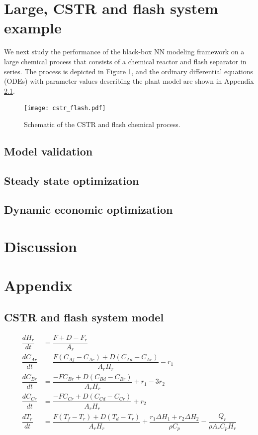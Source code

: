 \documentclass[10pt]{article}
\begin{document}
\section{Large, CSTR and flash system example}
We next study the performance of the black-box NN modeling framework on a large chemical process that consists of a chemical reactor and flash separator in series. The process is depicted in Figure \ref{fig:cstr_flash}, and the ordinary differential equations (ODEs) with parameter values describing the plant model are shown in Appendix \ref{app:cstr_flash}.

\begin{figure}[!h]
  \centering
  \texttt{[image: cstr\_flash.pdf]}
  \caption{Schematic of the CSTR and flash chemical process.}
  \label{fig:cstr_flash}
\end{figure}

\subsection{Model validation}

\subsection{Steady state optimization}

\subsection{Dynamic economic optimization}


\section{Discussion}


\section*{Appendix} 
\renewcommand{\thesubsection}{\Alph{subsection}}

\subsection{CSTR and flash system model} \label{app:cstr_flash}

\begin{align*}
  \dfrac{dH_r}{dt} &= \dfrac{F + D -F_r}{A_r}\\
  \dfrac{dC_{Ar}}{dt} &= \dfrac{F(C_{Af} -C_{Ar}) +
                         D(C_{Ad} -C_{Ar})}{A_rH_r} - r_1 \\
  \dfrac{dC_{Br}}{dt} &= \dfrac{-FC_{Br} + 
                          D(C_{Bd} -C_{Br})}{A_rH_r} + r_1 -3r_2\\
  \dfrac{dC_{Cr}}{dt} &= \dfrac{-FC_{Cr} + 
  D(C_{Cd} -C_{Cr})}{A_rH_r} + r_2\\
  \dfrac{dT_r}{dt} &= \dfrac{F(T_f - T_r) + D(T_d -T_r)}{A_rH_r} + 
                      \dfrac{r_1\Delta H_1 + r_2\Delta H_2}{\rho C_p} - 
                      \dfrac{Q_r}{\rho A_r C_p H_r}\\
\end{align*}
\end{document}
